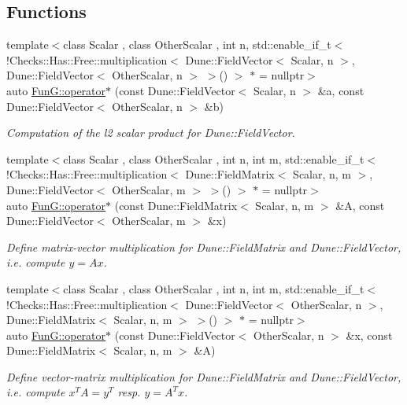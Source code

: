 \subsection*{Functions}
\begin{DoxyCompactItemize}
\item 
{\footnotesize template$<$class Scalar , class Other\+Scalar , int n, std\+::enable\+\_\+if\+\_\+t$<$ !\+Checks\+::\+Has\+::\+Free\+::multiplication$<$ Dune\+::\+Field\+Vector$<$ Scalar, n $>$, Dune\+::\+Field\+Vector$<$ Other\+Scalar, n $>$ $>$() $>$ $\ast$  = nullptr$>$ }\\auto \hyperlink{namespaceFunG_a5e258023361844926f485229c62a733b}{Fun\+G\+::operator$\ast$} (const Dune\+::\+Field\+Vector$<$ Scalar, n $>$ \&a, const Dune\+::\+Field\+Vector$<$ Other\+Scalar, n $>$ \&b)
\begin{DoxyCompactList}\small\item\em Computation of the l2 scalar product for Dune\+::\+Field\+Vector. \end{DoxyCompactList}\item 
{\footnotesize template$<$class Scalar , class Other\+Scalar , int n, int m, std\+::enable\+\_\+if\+\_\+t$<$ !\+Checks\+::\+Has\+::\+Free\+::multiplication$<$ Dune\+::\+Field\+Matrix$<$ Scalar, n, m $>$, Dune\+::\+Field\+Vector$<$ Other\+Scalar, m $>$ $>$() $>$ $\ast$  = nullptr$>$ }\\auto \hyperlink{namespaceFunG_abadb8da34a5abc3dde0107231ab91c6f}{Fun\+G\+::operator$\ast$} (const Dune\+::\+Field\+Matrix$<$ Scalar, n, m $>$ \&A, const Dune\+::\+Field\+Vector$<$ Other\+Scalar, m $>$ \&x)
\begin{DoxyCompactList}\small\item\em Define matrix-\/vector multiplication for Dune\+::\+Field\+Matrix and Dune\+::\+Field\+Vector, i.\+e. compute $y=Ax$. \end{DoxyCompactList}\item 
{\footnotesize template$<$class Scalar , class Other\+Scalar , int n, int m, std\+::enable\+\_\+if\+\_\+t$<$ !\+Checks\+::\+Has\+::\+Free\+::multiplication$<$ Dune\+::\+Field\+Vector$<$ Other\+Scalar, n $>$, Dune\+::\+Field\+Matrix$<$ Scalar, n, m $>$ $>$() $>$ $\ast$  = nullptr$>$ }\\auto \hyperlink{namespaceFunG_a19a9d7b55b56f5101560034413a1dbfe}{Fun\+G\+::operator$\ast$} (const Dune\+::\+Field\+Vector$<$ Other\+Scalar, n $>$ \&x, const Dune\+::\+Field\+Matrix$<$ Scalar, n, m $>$ \&A)
\begin{DoxyCompactList}\small\item\em Define vector-\/matrix multiplication for Dune\+::\+Field\+Matrix and Dune\+::\+Field\+Vector, i.\+e. compute $x^T A = y^T$ resp. $y=A^T x$. \end{DoxyCompactList}\item 

\end{DoxyCompactItemize}
